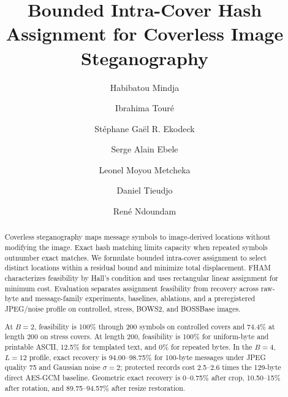\documentclass[preprint,12pt]{elsarticle}
\theoremstyle{plain}
\begin{document}
\begin{frontmatter}
\title{Bounded Intra-Cover Hash Assignment for Coverless Image Steganography}
\author[aff1]{Habibatou Mindja}
\author[aff2]{Ibrahima Tour\'e}
\author[aff1,aff4]{St\'ephane Ga\"el R. Ekodeck}
\author[aff1,aff4]{Serge Alain Ebele}
\author[aff1,aff4]{Leonel Moyou Metcheka}
\author[aff1]{Daniel Tieudjo}
\author[aff3,aff4]{Ren\'e Ndoundam}

\address[aff1]{University of Yaound\'e I, LIRIMA, Team GRIMCAPE, P.O. Box 812, Yaound\'e, Cameroon}

\address[aff2]{Institut Sup\'erieur des Technologies de Mamou, B.P. 063, Mamou, Republic of Guinea}

\address[aff3]{University of Bertoua, P.O. Box 416, Bertoua, Cameroon}

\address[aff4]{IRD, UMI UMMISCO, IRD France Nord, F-93143 Bondy, France}
\begin{abstract}{\color{blue}

Coverless steganography maps message symbols to image-derived locations without modifying the image. Exact hash matching limits capacity when repeated symbols outnumber exact matches. We formulate bounded intra-cover assignment to select distinct locations within a residual bound and minimize total displacement. FHAM characterizes feasibility by Hall's condition and uses rectangular linear assignment for minimum cost. Evaluation separates assignment feasibility from recovery across raw-byte and message-family experiments, baselines, ablations, and a preregistered JPEG/noise profile on controlled, stress, BOWS2, and BOSSBase images.

At $B=2$, feasibility is 100\% through 200 symbols on controlled covers and 74.4\% at length 200 on stress covers. At length 200, feasibility is 100\% for uniform-byte and printable ASCII, 12.5\% for templated text, and 0\% for repeated bytes. In the $B=4$, $L=12$ profile, exact recovery is 94.00--98.75\% for 100-byte messages under JPEG quality 75 and Gaussian noise $\sigma=2$; protected records cost 2.5--2.6 times the 129-byte direct AES-GCM baseline. Geometric exact recovery is 0--0.75\% after crop, 10.50--15\% after rotation, and 89.75--94.57\% after resize restoration.

}
\end{abstract}
\end{frontmatter}
\end{document}
